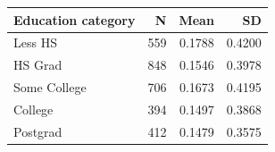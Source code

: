 \begin{tabular*}{\linewidth}{@{\extracolsep{\fill}}lrrr}\toprule
Education category & N & Mean & SD \\
\midrule
Less HS &       559 &    0.1788 &    0.4200 \\
HS Grad &       848 &    0.1546 &    0.3978 \\
Some College &       706 &    0.1673 &    0.4195 \\
College &       394 &    0.1497 &    0.3868 \\
Postgrad &       412 &    0.1479 &    0.3575 \\
\bottomrule\end{tabular*}
